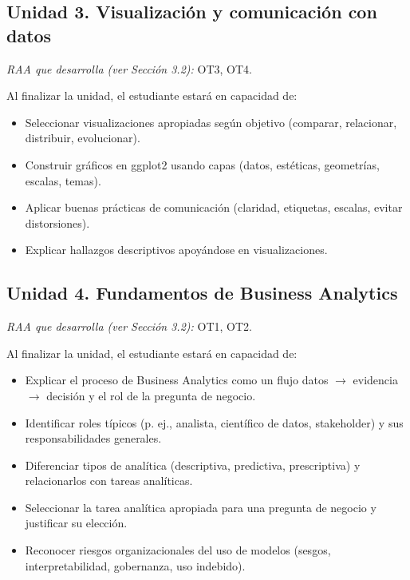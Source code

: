 \documentclass[11pt,a4paper]{article}
\begin{document}
\subsection*{Unidad 3. Visualización y comunicación con datos}

\textit{RAA que desarrolla (ver Sección 3.2):} OT3, OT4.

Al finalizar la unidad, el estudiante estará en capacidad de:

\begin{itemize}
    \item Seleccionar visualizaciones apropiadas según objetivo (comparar, relacionar, distribuir, evolucionar).
    \item Construir gráficos en ggplot2 usando capas (datos, estéticas, geometrías, escalas, temas).
    \item Aplicar buenas prácticas de comunicación (claridad, etiquetas, escalas, evitar distorsiones).
    \item Explicar hallazgos descriptivos apoyándose en visualizaciones.
\end{itemize}

\subsection*{Unidad 4. Fundamentos de Business Analytics}

\textit{RAA que desarrolla (ver Sección 3.2):} OT1, OT2.

Al finalizar la unidad, el estudiante estará en capacidad de:

\begin{itemize}
    \item Explicar el proceso de Business Analytics como un flujo datos $\rightarrow$ evidencia $\rightarrow$ decisión y el rol de la pregunta de negocio.
    \item Identificar roles típicos (p. ej., analista, científico de datos, stakeholder) y sus responsabilidades generales.
    \item Diferenciar tipos de analítica (descriptiva, predictiva, prescriptiva) y relacionarlos con tareas analíticas.
    \item Seleccionar la tarea analítica apropiada para una pregunta de negocio y justificar su elección.
    \item Reconocer riesgos organizacionales del uso de modelos (sesgos, interpretabilidad, gobernanza, uso indebido).
\end{itemize}
\end{document}
